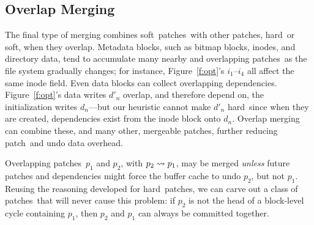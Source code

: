 \documentclass[9pt,twocolumn,letterpaper]{article}
\newcommand{\patch}{patch}
\newcommand{\patches}{patches}
\newcommand{\nrb}{hard}
\newcommand{\rb}{soft}
\begin{document}
\subsection{Overlap Merging}
\label{sec:patches:merge:overlap}

The final type of merging combines \rb\ \patches\ with other \patches,
\nrb\ or \rb, when they overlap.
%
Metadata blocks, such as bitmap blocks, inodes, and directory data, tend to
accumulate many nearby and overlapping \patches\ as the file system
gradually changes; for instance, Figure~\ref{f:opt}'s $i_1$--$i_4$ all
affect the same inode field.
%
Even data blocks can collect overlapping dependencies. Figure~\ref{f:opt}'s
 data writes $d'_n$ overlap, and therefore depend on, the initialization
 writes $d_n$---but
%
our heuristic cannot make $d'_n$ \nrb\ since when they are created,
 dependencies exist from the inode block onto $d_n$.
%
Overlap merging can combine these, and many other, mergeable patches,
further reducing \patch\ and undo data overhead.


Overlapping \patches\ $p_1$ and $p_2$, with $p_2 \leadsto p_1$, may be
merged \emph{unless} future patches and dependencies might
force the buffer cache to undo $p_2$, but not $p_1$.
%
Reusing the reasoning developed for \nrb\ \patches, we can carve out a
class of \patches\ that will never cause this problem:
%
if $p_2$ is not the head of a block-level cycle containing $p_1$,
then $p_2$ and $p_1$ can always be committed together.
\end{document}
